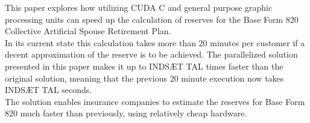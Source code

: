 


This paper explores how utilizing CUDA C and general purpose graphic processing units can speed up the calculation of reserves for the Base Form 820 Collective Artificial Spouse Retirement Plan. \\

In its current state this calculation takes more than 20 minutes per customer if a decent approximation of the reserve is to be achieved. The parallelized solution presented in this paper makes it up to INDSÆT TAL times faster than the original solution, meaning that the previous 20 minute execution now takes INDSÆT TAL seconds. \\

The solution enables insurance companies to estimate the reserves for Base Form 820 much faster than previously, using relatively cheap hardware.
